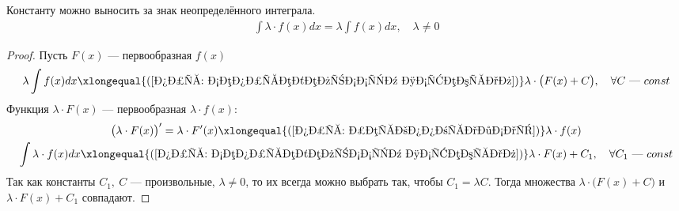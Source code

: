 \begin{property}
    Константу можно выносить за знак неопределённого интеграла.
    \begin{gather*}
        \boxed{\int \lambda\cdot f(x)dx = \lambda \int f(x)dx},\quad \lambda \ne 0
    \end{gather*}
\end{property}
\begin{proof}
    Пусть $F(x)$ --- первообразная $f(x)$
    \begin{gather*}
        \lambda \int f(x)dx \xlongequal{(\ref{опр: неопределённый интеграл})} \lambda \cdot \big(F(x) + C\big),\quad \forall C \text{ --- } const
    \end{gather*}
    Функция $\lambda \cdot F(x)$ --- первообразная $\lambda \cdot f(x)\colon$
    \begin{gather*}
        \big(\lambda \cdot F(x)\big)' = \lambda\cdot F'(x) \xlongequal{(\ref{опр: первообразная})} \lambda\cdot f(x)\\
        \int \lambda\cdot f(x)dx \xlongequal{(\ref{опр: неопределённый интеграл})} \lambda\cdot F(x) + C_1,\quad \forall C_1 \text{ --- } const
    \end{gather*}
    Так как константы $C_1,\ C$ --- произвольные, $\lambda \ne 0$, то их всегда можно выбрать так, чтобы $C_1 = \lambda C$. Тогда множества $\lambda\cdot\big(F(x) + C\big)$ и $\lambda\cdot F(x) + C_1$ совпадают.
\end{proof}

